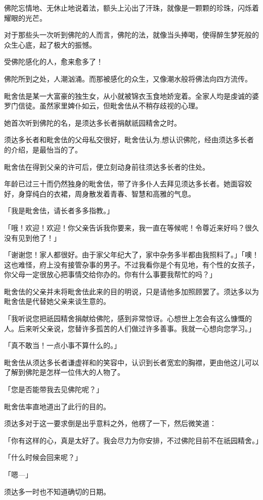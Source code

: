 \documentclass[twoside,openany]{book}
\begin{document}
佛陀忘情地、无休止地说着法，额头上沁出了汗珠，就像是一颗颗的珍珠，闪烁着耀眼的光芒。

对于那些头一次听到佛陀的人而言，佛陀的法，就像当头捧喝，使得醉生梦死般的众生心底，起了极大的振憾。

受佛陀感化的人，愈来愈多了！

佛陀所到之处，人潮汹涌。而那被感化的众生，又像潮水般将佛法向四方流传。

毗舍佉是某一大富豪的独生女，从小就被锦衣玉食地娇宠着。全家人均是虔诚的婆罗门信徒。虽然家里婢仆如云，但毗舍佉从不稍存歧视的心理。

她首次听到佛陀的名，是须达多长者捐献祇园精舍之时。

须达多长者和毗舍佉的父母私交很好，毗舍佉认为,想认识佛陀，经由须达多长者的介绍，是最怡当的了。

毗舍佉在得到父亲的许可后，便立刻动身前往须达多长者的住处。

年龄已过三十而仍然独身的毗舍佉，带了许多仆人去拜见须达多长者。她面容姣好，身穿纯白的衣裙，周身散发着青春、智慧和高雅的气息。

「我是毗舍佉，请长者多多指教。」

「哦！欢迎！欢迎！你父亲告诉我你要来，我一直在等候呢！令尊近来好吗？很久没有见到他了！」

「谢谢您！家人都很好。由于家父年纪大了，家中杂务多半都由我照料了。」「噢！这也难怪，府上没有接管杂事的男子。不过我看你是个有见地，有个性的女孩子，你父母一定很放心把事情交给你办的。你有什么事要我帮忙的吗？」

毗舍佉的父亲并未将毗舍佉此来的目的明说，只是请他多加照顾罢了。须达多以为毗舍佉是代替她父亲来谈生意的。

「我听说您把祇园精舍捐献给佛陀，感到非常惊讶。心想世上怎会有这么慷慨的人。后来听父亲说，您替许多孤苦的人们做过许多善事。我就一心想向您学习。」

「真不敢当！一点小事不算什么的。」

毗舍佉从须达多长者谦虚祥和的笑容中，认识到长者宽宏的胸襟，更由他这儿可以了解到佛陀是怎样一位伟大的人物了。

「您是否能带我去见佛陀呢？」

毗舍佉率直地道出了此行的目的。

须达多对于这一要求倒是出乎意料之外，他楞了一下，然后微笑道：

「你有这样的心，真是太好了。我会尽力为你安排，不过佛陀目前不在祇园精舍。」

「什么时候会回来呢？」

「嗯---」

须达多一时也不知道确切的日期。
\end{document}
